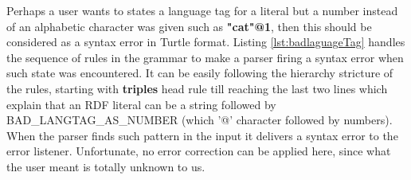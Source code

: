 \begin{enumerate}
 Perhaps a user wants to states a language tag for a literal but a number instead of an alphabetic character was given such as \textbf{"cat"@1}, then this should be considered as a syntax error in Turtle format. Listing \ref{lst:badlaguageTag} handles the sequence of rules in the grammar to make a parser firing a syntax error when such state was encountered. It can be easily following the hierarchy stricture of the rules, starting with \textbf{triples} head rule till reaching the last two lines which explain that an RDF literal can be a string followed by BAD\_LANGTAG\_AS\_NUMBER (which '@' character followed by numbers). When the parser finds such pattern in the input it delivers a syntax error to the error listener. Unfortunate, no error correction can be applied here, since what the user meant is totally unknown to us.     
\end{enumerate}
